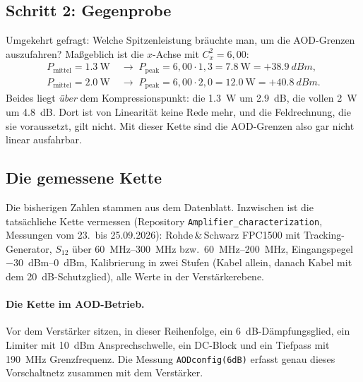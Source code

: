 \documentclass[11pt,a4paper]{article}
\newcommand{\crest}{\ensuremath{C}}
\begin{document}
\medskip
\noindent{}

\subsection{Schritt 2: Gegenprobe}

Umgekehrt gefragt: Welche Spitzenleistung bräuchte man, um die AOD-Grenzen
auszufahren? Maßgeblich ist die $x$-Achse mit $\crest_x^2=6{,}00$:
\begin{align}
  P_\mathrm{mittel} = \SI{1.3}{\watt} &\;\rightarrow\; P_\mathrm{peak} = 6{,}00\cdot1{,}3 = \SI{7.8}{\watt} = +\SI{38.9}{dBm},\\
  P_\mathrm{mittel} = \SI{2.0}{\watt} &\;\rightarrow\; P_\mathrm{peak} = 6{,}00\cdot2{,}0 = \SI{12.0}{\watt} = +\SI{40.8}{dBm}.
\end{align}
Beides liegt \emph{über} dem Kompressionspunkt: die \SI{1.3}{\watt} um
\SI{2.9}{\deci\bel}, die vollen \SI{2}{\watt} um \SI{4.8}{\deci\bel}. Dort
ist von Linearität keine Rede mehr, und die Feldrechnung, die sie voraussetzt,
gilt nicht. Mit dieser Kette sind die AOD-Grenzen also gar nicht linear
ausfahrbar.

\subsection{Die gemessene Kette}\label{sec:messkette}

Die bisherigen Zahlen stammen aus dem Datenblatt. Inzwischen ist die
tatsächliche Kette vermessen (Repository \texttt{Amplifier\_characterization},
Messungen vom 23.\ bis 25.09.2026): Rohde\,\&\,Schwarz FPC1500 mit
Tracking-Generator, $S_{12}$ über \SIrange{60}{300}{\mega\hertz} bzw.\
\SIrange{60}{200}{\mega\hertz}, Eingangspegel \SIrange{-30}{0}{dBm},
Kalibrierung in zwei Stufen (Kabel allein, danach Kabel mit dem
\SI{20}{\deci\bel}-Schutzglied), alle Werte in der Verstärkerebene.

\paragraph{Die Kette im AOD-Betrieb.}
Vor dem Verstärker sitzen, in dieser Reihenfolge, ein
\SI{6}{\deci\bel}-Dämpfungsglied, ein Limiter mit \SI{10}{dBm}
Ansprechschwelle, ein DC-Block und ein Tiefpass mit \SI{190}{\mega\hertz}
Grenzfrequenz. Die Messung \texttt{AODconfig(6dB)} erfasst genau dieses
Vorschaltnetz zusammen mit dem Verstärker.
\end{document}
